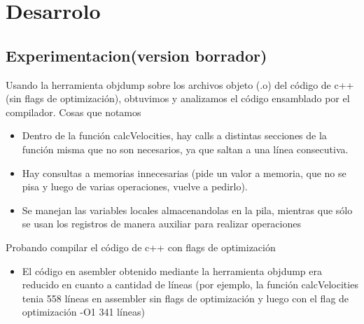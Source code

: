 \section{Desarrolo}%



\subsection{Experimentacion(version borrador)}

Usando la herramienta objdump sobre los archivos objeto (.o) del código de c++ (sin flags de optimización), obtuvimos y analizamos el código ensamblado por el compilador.
Cosas que notamos 
\begin{itemize}
	\item Dentro de la función calcVelocities, hay calls a distintas secciones de la función misma que no son necesarios, ya que saltan a una línea consecutiva.
	\item Hay consultas a memorias innecesarias (pide un valor a memoria, que no se pisa y luego de varias operaciones, vuelve a pedirlo).
	\item Se manejan las variables locales almacenandolas en la pila, mientras que sólo se usan los registros de manera auxiliar para realizar operaciones
\end{itemize}

\newline

Probando compilar el código de c++ con flags de optimización

\begin{itemize}
	\item El código en asembler obtenido mediante la herramienta objdump era reducido en cuanto a cantidad de líneas (por ejemplo, la función calcVelocities tenia 558 líneas en assembler sin flags de optimización y luego con el flag de optimización -O1 341 líneas)
\end{itemize}